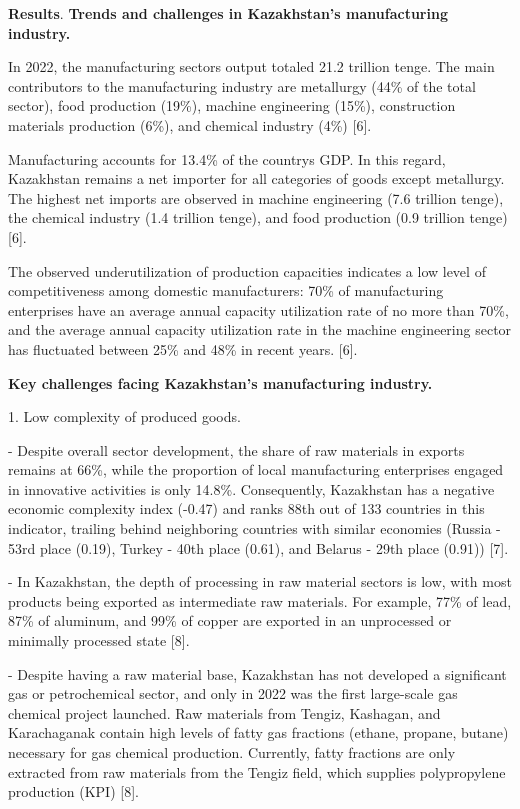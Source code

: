 \begin{multicols}{2}
{\bfseries Results}. {\bfseries Trends and challenges in Kazakhstan's
manufacturing industry.}

In 2022, the manufacturing sector\textquotesingle s output totaled 21.2
trillion tenge. The main contributors to the manufacturing industry are
metallurgy (44\% of the total sector), food production (19\%), machine
engineering (15\%), construction materials production (6\%), and
chemical industry (4\%) {[}6{]}.

Manufacturing accounts for 13.4\% of the country\textquotesingle s GDP.
In this regard, Kazakhstan remains a net importer for all categories of
goods except metallurgy. The highest net imports are observed in machine
engineering (7.6 trillion tenge), the chemical industry (1.4 trillion
tenge), and food production (0.9 trillion tenge) {[}6{]}.

The observed underutilization of production capacities indicates a low
level of competitiveness among domestic manufacturers: 70\% of
manufacturing enterprises have an average annual capacity utilization
rate of no more than 70\%, and the average annual capacity utilization
rate in the machine engineering sector has fluctuated between 25\% and
48\% in recent years. {[}6{]}.

{\bfseries Key challenges facing Kazakhstan's manufacturing industry.}

1. Low complexity of produced goods.

- Despite overall sector development, the share of raw materials in
exports remains at 66\%, while the proportion of local manufacturing
enterprises engaged in innovative activities is only 14.8\%.
Consequently, Kazakhstan has a negative economic complexity index
(-0.47) and ranks 88th out of 133 countries in this indicator, trailing
behind neighboring countries with similar economies (Russia - 53rd place
(0.19), Turkey - 40th place (0.61), and Belarus - 29th place (0.91))
{[}7{]}.

- In Kazakhstan, the depth of processing in raw material sectors is low,
with most products being exported as intermediate raw materials. For
example, 77\% of lead, 87\% of aluminum, and 99\% of copper are exported
in an unprocessed or minimally processed state {[}8{]}.

- Despite having a raw material base, Kazakhstan has not developed a
significant gas or petrochemical sector, and only in 2022 was the first
large-scale gas chemical project launched. Raw materials from Tengiz,
Kashagan, and Karachaganak contain high levels of fatty gas fractions
(ethane, propane, butane) necessary for gas chemical production.
Currently, fatty fractions are only extracted from raw materials from
the Tengiz field, which supplies polypropylene production (KPI) {[}8{]}.


\end{multicols}
